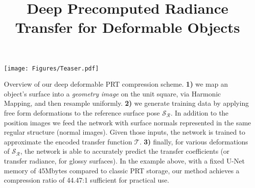 \documentclass[sigconf]{acmart}
\begin{document}
\title{Deep Precomputed Radiance Transfer for Deformable Objects}

%
%





%
\begin{teaserfigure}
  \centering
  \texttt{[image: Figures/Teaser.pdf]}
  \label{Fig: Teaser}
  \caption{Overview of our deep deformable PRT compression scheme. \textbf{1)} we map an object's surface into a \textit{geometry image}  \citep{gu2002geometry} on the unit square, via Harmonic Mapping, and then resample uniformly. \textbf{2)} we generate training data by applying free form deformations to the reference surface pose $\mathcal{S_R}$. In addition to the position images we feed the network with surface normals represented in the same regular structure (normal images). Given those inputs, the network is trained to approximate the encoded transfer function $\mathcal{T}$. \textbf{3)} finally, for various deformations of $\mathcal{S_R}$, the network is able to accurately predict the transfer coefficients (or transfer radiance, for glossy surfaces). In the example above, with a fixed U-Net memory of 45Mbytes compared to classic PRT storage, our method achieves a compression ratio of 44.47:1 sufficient for practical use.}
\end{teaserfigure}
\maketitle
%
%

%

%

%

%


%


%
%
\end{document}
